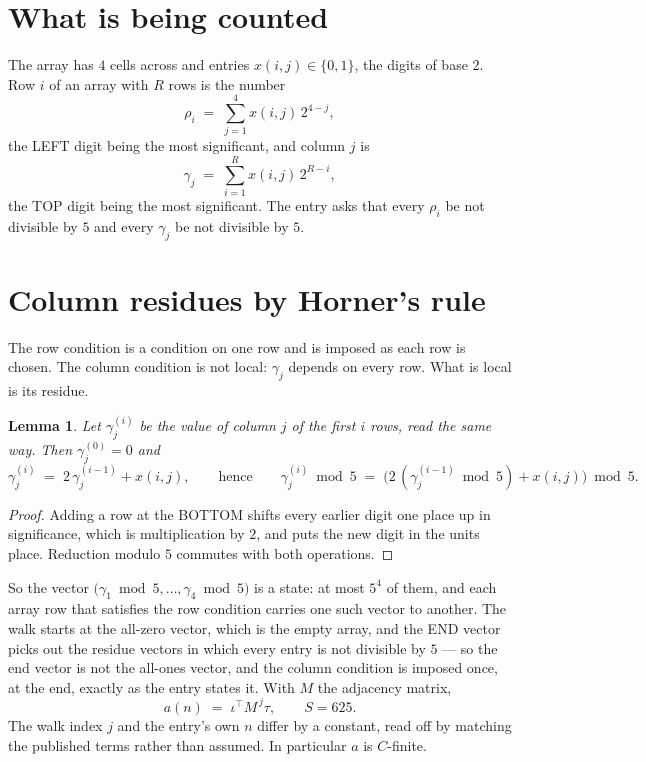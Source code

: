 \documentclass[11pt,a4paper]{article}
\theoremstyle{plain}
\newtheorem{lemma}[theorem]{Lemma}
\theoremstyle{definition}
\begin{document}
\section{What is being counted}

The array has $4$ cells across and entries $x(i,j)\in\{0,1\}$, the digits of
base $2$. Row $i$ of an array with $R$ rows is the number
\[
\rho_i\;=\;\sum_{j=1}^{4}x(i,j)\,2^{4-j} ,
\]
the LEFT digit being the most significant, and column $j$ is
\[
\gamma_j\;=\;\sum_{i=1}^{R}x(i,j)\,2^{R-i} ,
\]
the TOP digit being the most significant. The entry asks that every $\rho_i$ be not divisible by
$5$ and every $\gamma_j$ be not divisible by $5$.


\section{Column residues by Horner's rule}

The row condition is a condition on one row and is imposed as each row is chosen. The column
condition is not local: $\gamma_j$ depends on every row. What is local is its residue.

\begin{lemma}\label{lem:horner}
Let $\gamma_j^{(i)}$ be the value of column $j$ of the first $i$ rows, read the same way.
Then $\gamma_j^{(0)}=0$ and
\[
\gamma_j^{(i)}\;=\;2\,\gamma_j^{(i-1)}+x(i,j),
\qquad\text{hence}\qquad
\gamma_j^{(i)}\bmod 5\;=\;
\bigl(2\,(\gamma_j^{(i-1)}\bmod 5)+x(i,j)\bigr)\bmod 5 .
\]
\end{lemma}

\begin{proof}
Adding a row at the BOTTOM shifts every earlier digit one place up in significance, which is
multiplication by $2$, and puts the new digit in the units place. Reduction modulo
$5$ commutes with both operations.
\end{proof}

So the vector $\bigl(\gamma_1\bmod 5,\dots,\gamma_{4}\bmod
5\bigr)$ is a state: at most $5^{4}$ of them, and each array row
that satisfies the row condition carries one such vector to another. The walk starts at the
all-zero vector, which is the empty array, and the END vector picks out the residue vectors in
which every entry is not divisible by $5$ --- so the end vector is not the all-ones
vector, and the column condition is imposed once, at the end, exactly as the entry states it.
With $M$ the adjacency matrix,
\[
a(n)\;=\;\iota^{\!\top}M^{\,j}\tau ,\qquad S=625.
\]
The walk index $j$ and the entry's own $n$ differ by a constant, read off by matching the
published terms rather than assumed. In particular $a$ is $C$-finite.
\end{document}
